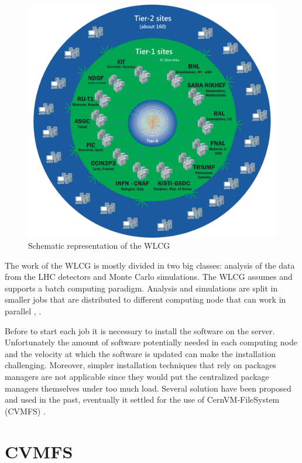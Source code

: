\begin{figure}
\includegraphics[width=\textwidth,height=\textheight,keepaspectratio]{gfx/WLCG}
\caption{Schematic representation of the WLCG}
\label{fig:wlcg-schema}
\end{figure}

The work of the WLCG is mostly divided in two big classes: analysis of the data
from the LHC detectors and Monte Carlo simulations.  The WLCG assumes and
supports a batch computing paradigm. Analysis and simulations are split in
smaller jobs that are distributed to different computing node that can work in
parallel \cite{grid:report}, \cite{grid:update}.

Before to start each job it is necessary to install the software on the server.
Unfortunately the amount of software potentially needed in each computing node
and the velocity at which the software is updated can make the installation
challenging. Moreover, simpler installation techniques that rely on packages
managers are not applicable since they would put the centralized package
managers themselves under too much load. Several solution have been proposed
and used in the past, eventually it settled for the use of CernVM-FileSystem
(CVMFS) \cite{cvmfs}.

\section{CVMFS} \label{sec:cvmfs}


